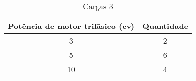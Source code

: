 \begin{table}[H]
\centering
\caption{Cargas 3}
\label{table:3}
\begin{tabular}{|c|c|}
\hline
Potência de motor trifásico (cv) & Quantidade \\ \hline
3                                & 2          \\ \hline
5                                & 6          \\ \hline
10                               & 4          \\ \hline
\end{tabular}
\end{table}